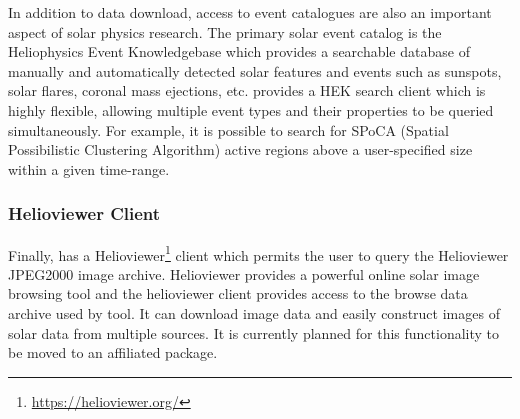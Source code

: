 In addition to data download, access to event catalogues are also an important aspect of solar physics research.
The primary solar event catalog is the Heliophysics Event Knowledgebase \citep[HEK,][]{hek} which provides a searchable database of manually and automatically detected solar features and events such as sunspots, solar flares, coronal mass ejections, etc. \sunpypkg provides a HEK search client which is highly flexible, allowing multiple event types and their properties to be queried simultaneously.
For example, it is possible to search for SPoCA (Spatial Possibilistic Clustering Algorithm) \citep{2014AA...561A..29V} active regions above a user-specified size within a given time-range.

\subsubsection{Helioviewer Client}
\label{sec:helioviewer}

Finally,  has a Helioviewer\footnote{\url{https://helioviewer.org/}} client which permits the user to query the Helioviewer JPEG2000 image archive.
Helioviewer provides a powerful online solar image browsing tool and the helioviewer client provides access to the browse data archive used by tool.
It can download image data and easily construct images of solar data from multiple sources.
It is currently planned for this functionality to be moved to an affiliated package.
